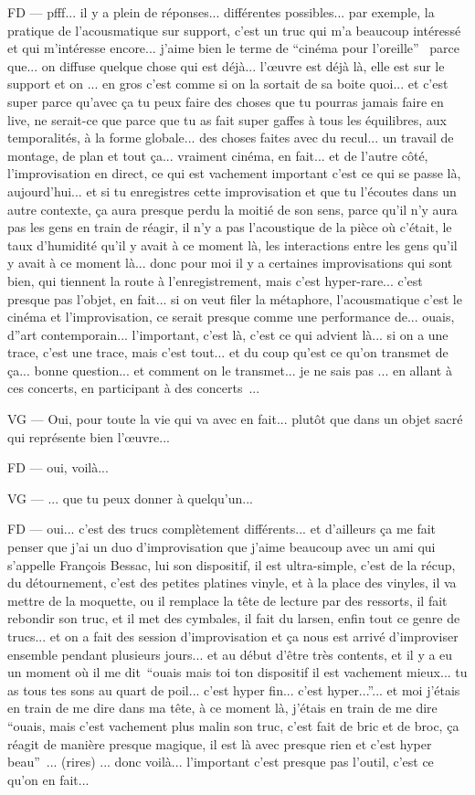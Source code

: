 FD — pfff... il y a plein de réponses... différentes possibles... par exemple, la pratique de l'acousmatique sur support, c'est un truc qui m'a beaucoup intéressé et qui m'intéresse encore... j'aime bien le terme de ``cinéma pour l'oreille''  parce que... on diffuse quelque chose qui est déjà... l'œuvre est déjà là, elle est sur le support et on ... en gros c'est comme si on la sortait de sa boite quoi... et c'est super parce qu'avec ça tu peux faire des choses que tu pourras jamais faire en live, ne serait-ce que parce que tu as fait super gaffes à tous les équilibres, aux temporalités, à la forme globale... des choses faites avec du recul... un travail de montage, de plan et tout ça... vraiment cinéma, en fait... et de l'autre côté, l'improvisation en direct, ce qui est vachement important c'est ce qui se passe là, aujourd'hui... et si tu enregistres cette improvisation et que tu l'écoutes dans un autre contexte, ça aura presque perdu la moitié de son sens, parce qu'il n'y aura pas les gens en train de réagir, il n'y a pas l'acoustique de la pièce où c'était, le taux d'humidité qu'il y avait à ce moment là, les interactions entre les gens qu'il y avait à ce moment là... donc pour moi il y a certaines improvisations qui sont bien, qui tiennent la route à l'enregistrement, mais c'est hyper-rare... c'est presque pas l'objet, en fait... si on veut filer la métaphore, l'acousmatique c'est le cinéma et l'improvisation, ce serait presque comme une performance de... ouais, d''art contemporain... l'important, c'est là, c'est ce qui advient là... si on a une trace, c'est une trace, mais c'est tout... et du coup qu'est ce qu'on transmet de ça... bonne question... et comment on le transmet... je ne sais pas ... en allant à ces concerts, en participant à des concerts ... 

VG — Oui, pour toute la vie qui va avec en fait... plutôt que dans un objet sacré qui représente bien l'œuvre... 

FD — oui, voilà... 

VG — ... que tu peux donner à quelqu'un... 

FD — oui... c'est des trucs complètement différents... et d'ailleurs ça me fait penser que j'ai un duo d'improvisation que j'aime beaucoup avec un ami qui s'appelle François Bessac, lui son dispositif, il est ultra-simple, c'est de la récup, du détournement, c'est des petites platines vinyle, et à la place des vinyles, il va mettre de la moquette, ou il remplace la tête de lecture par des ressorts, il fait rebondir son truc, et il met des cymbales, il fait du larsen, enfin tout ce genre de trucs... et on a fait des session d'improvisation et ça nous est arrivé d'improviser ensemble pendant plusieurs jours... et au début d'être très contents, et il y a eu un moment où il me dit ``ouais mais toi ton dispositif il est vachement mieux... tu as tous tes sons au quart de poil... c'est hyper fin... c'est hyper...''... et moi j'étais en train de me dire dans ma tête, à ce moment là, j'étais en train de me dire ``ouais, mais c'est vachement plus malin son truc, c'est fait de bric et de broc, ça réagit de manière presque magique, il est là avec presque rien et c'est hyper beau'' ... (rires) ... donc voilà... l'important c'est presque pas l'outil, c'est ce qu'on en fait... 

